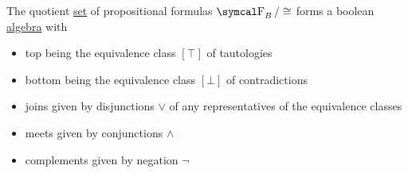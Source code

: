 \begin{theorem}\label{thm:propositional_logic_boolean_algebra}
  The quotient \hyperref[def:equivalence_relation]{set} of propositional formulas \( \CF_B / \cong \) forms a boolean \hyperref[def:boolean_algebra]{algebra} with
  \begin{itemize}
    \item top being the equivalence class \( [\top] \) of tautologies
    \item bottom being the equivalence class \( [\bot] \) of contradictions
    \item joins given by disjunctions \( \vee \) of any representatives of the equivalence classes
    \item meets given by conjunctions \( \wedge \)
    \item complements given by negation \( \neg \)
  \end{itemize}
\end{theorem}
